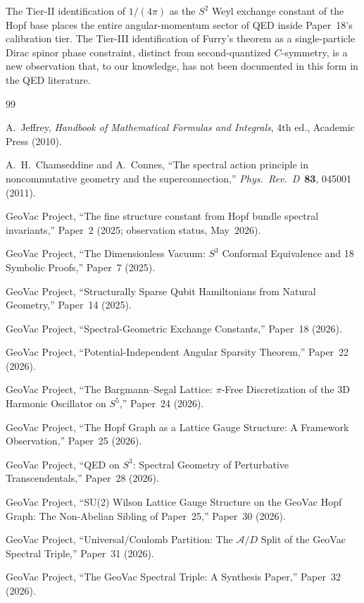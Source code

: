 \documentclass[11pt]{article}
\begin{document}
The Tier-II identification of $1/(4\pi)$ as the $S^2$ Weyl exchange
constant of the Hopf base places the entire angular-momentum sector
of QED inside Paper~18's calibration tier.  The Tier-III
identification of Furry's theorem as a single-particle Dirac spinor
phase constraint, distinct from second-quantized $C$-symmetry, is a
new observation that, to our knowledge, has not been documented in
this form in the QED literature.

\begin{thebibliography}{99}

A.~Jeffrey, \textit{Handbook of Mathematical Formulas and
Integrals}, 4th ed., Academic Press (2010).

A.~H.~Chamseddine and A.~Connes,
``The spectral action principle in noncommutative geometry and the
superconnection,''
\textit{Phys.~Rev.~D}\ \textbf{83}, 045001 (2011).

GeoVac Project, ``The fine structure constant from Hopf bundle
spectral invariants,'' Paper~2 (2025; observation status, May~2026).

GeoVac Project, ``The Dimensionless Vacuum: $S^3$ Conformal
Equivalence and 18 Symbolic Proofs,'' Paper~7 (2025).

GeoVac Project, ``Structurally Sparse Qubit Hamiltonians from Natural
Geometry,'' Paper~14 (2025).

GeoVac Project, ``Spectral-Geometric Exchange Constants,'' Paper~18
(2026).

GeoVac Project, ``Potential-Independent Angular Sparsity Theorem,''
Paper~22 (2026).

GeoVac Project, ``The Bargmann--Segal Lattice: $\pi$-Free
Discretization of the 3D Harmonic Oscillator on $S^5$,'' Paper~24
(2026).

GeoVac Project, ``The Hopf Graph as a Lattice Gauge Structure: A
Framework Observation,'' Paper~25 (2026).

GeoVac Project, ``QED on $S^3$: Spectral Geometry of Perturbative
Transcendentals,'' Paper~28 (2026).

GeoVac Project, ``SU(2) Wilson Lattice Gauge Structure on the GeoVac
Hopf Graph: The Non-Abelian Sibling of Paper~25,'' Paper~30 (2026).

GeoVac Project, ``Universal/Coulomb Partition: The $\mathcal{A}/D$
Split of the GeoVac Spectral Triple,'' Paper~31 (2026).

GeoVac Project, ``The GeoVac Spectral Triple: A Synthesis Paper,''
Paper~32 (2026).

\end{thebibliography}
\end{document}
